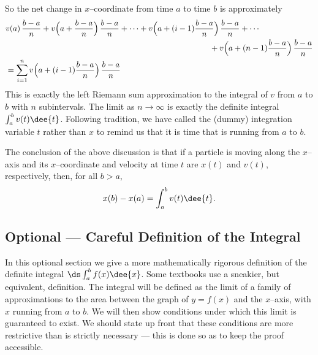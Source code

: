 \begin{eg}
\begin{itemize}
\end{itemize}
So the net change in $x$--coordinate from time $a$ to time $b$ is approximately
\begin{align*}
&v(a)\,\frac{b-a}{n} + v\Big(a+\frac{b-a}{n}\Big)\,\frac{b-a}{n} +\cdots
+v\Big(a+(i-1)\frac{b-a}{n}\Big)\,\frac{b-a}{n} + \cdots \\
&\hskip3.5in
+v\Big(a+(n-1)\frac{b-a}{n}\Big)\,\frac{b-a}{n} \\
&= \sum_{i=1}^n v\Big(a+(i-1)\frac{b-a}{n}\Big)\,\frac{b-a}{n}
\end{align*}
This is exactly the left Riemann sum approximation to the integral of $v$
from $a$ to $b$ with $n$ subintervals. The limit as $n\rightarrow\infty$
is exactly the definite integral $\int_a^b v(t)\dee{t}$. Following tradition,
we have called the (dummy) integration variable $t$ rather than $x$ to
remind us that it is time that is running from $a$ to $b$.

The conclusion of the above discussion is that if a particle is moving
along the $x$--axis and its $x$--coordinate and velocity at time $t$ are
$x(t)$ and $v(t)$, respectively, then, for all $b>a$,
\begin{align*}
x(b)  - x(a) = \int_a^b v(t)\dee{t}.
\end{align*}

\end{eg}



\subsection{Optional --- Careful Definition of the Integral}\label{ssec
careful defn}
In this optional section we give a more mathematically rigorous definition of
the definite
integral $\ds \int_a^b f(x)\dee{x}$. Some textbooks use a sneakier, but
equivalent,
definition. The integral will be defined as the limit of a family of
approximations to the
area between the graph of $y=f(x)$ and the $x$--axis, with $x$ running from $a$
to $b$.
We will then show conditions under which this limit is guaranteed to exist. We
should
state up front that these conditions are more restrictive than is strictly
necessary ---
this is done so as to keep the proof accessible.

